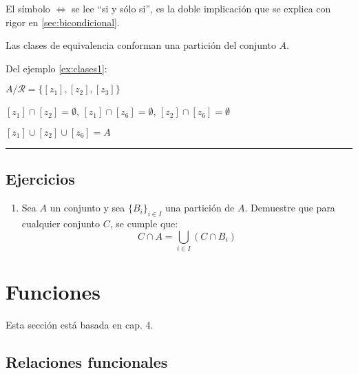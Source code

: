 \begin{lgnote}
	El símbolo $\iff$ se lee ``si y sólo si'', es la doble implicación que se explica con rigor en \ref{sec:bicondicional}.
\end{lgnote}

Las clases de equivalencia conforman una partición del conjunto $A$.

\begin{fmd-example}[Particiones]
	Del ejemplo \ref{ex:clases1}:
	
	\begin{minipage}{.45\textwidth}
		\begin{figure}[H]
			\centering
			
		\end{figure}
	\end{minipage}
	\begin{minipage}{.45\textwidth}
		\centering
		$A/\mathcal{R} = \{ [z_1], [z_2], [z_3] \}$
		\vspace{2mm}
		
		$[z_1] \cap [z_2] = \emptyset$, $[z_1] \cap [z_6] = \emptyset$, $[z_2] \cap [z_6] = \emptyset$
		\vspace{2mm}
		
		$[z_1] \cup [z_2] \cup [z_6] = A$
	\end{minipage}
\end{fmd-example}

\rule{\textwidth}{.5pt}

\subsection{Ejercicios}

\begin{enumerate}
	
	\item Sea $A$ un conjunto y sea $\{B_i\}_{i \in I}$ una partición de $A$. Demuestre que para cualquier conjunto $C$, se cumple que:
	\[ C \cap A = \bigcup_{i \in I} (C \cap B_i) \]
\end{enumerate}

\section{Funciones}
Esta sección está basada en \cite{rojoAlgebra8vaEd} cap. 4. 
\subsection{Relaciones funcionales} \label{sec:relaciones}

